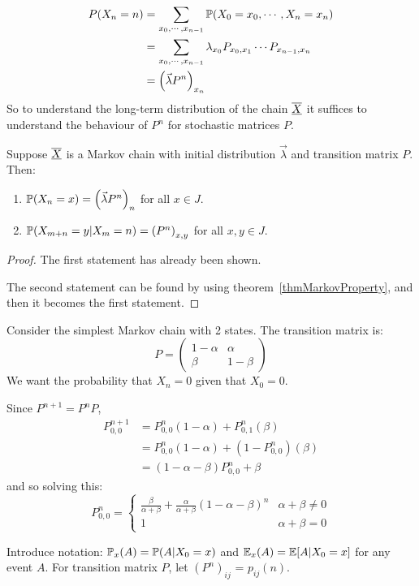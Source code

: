 \documentclass[../Main.tex]{subfiles}
\begin{document}
\begin{align*}
    P(X_n = n) &= \sum_{x_0, \cdots, x_{n - 1}} \P(X_0 = x_0, \cdots, X_n = x_n) \\
    &= \sum_{x_0, \cdots, x_{n-1}} \lambda_{x_0} \Pmat{0}{1} \cdots \Pmat{n-1}{n} \\
    &= \left(\vec{\lambda} P^n\right)_{x_n}
\end{align*}
So to understand the long-term distribution of the chain $\chain{X}$ it suffices to understand the behaviour of $P^n$ for stochastic matrices $P$.

\begin{theorem}
    Suppose $\chain{X}$ is a Markov chain with initial distribution $\vec{\lambda}$ and transition matrix $P$. Then:
    \begin{enumerate}
        \item $\P(X_n = x) = \left(\vec{\lambda} P^n\right)_n$ for all $x \in J$.
        \item $\P(X_{m + n} = y | X_m = n) = \left(P^n\right)_{x, y}$ for all $x, y \in J$.
    \end{enumerate}
    \label{thmMarkovMatPower}
\end{theorem}
\begin{proof}
    The first statement has already been shown.

    The second statement can be found by using theorem~\ref{thmMarkovProperty}, and then it becomes the first statement.
\end{proof}
\begin{example}
    Consider the simplest Markov chain with 2 states.
    The transition matrix is:
    \begin{equation*}
        P = 
        \begin{pmatrix}
            1 - \alpha & \alpha \\
            \beta & 1 - \beta
        \end{pmatrix}
    \end{equation*}
    We want the probability that $X_n = 0$ given that $X_0 = 0$.

    Since $P^{n+1} = P^n P$, 
    \begin{align*}
        P_{0, 0}^{n+1} &= P_{0, 0}^n (1 - \alpha) + P_{0, 1}^n (\beta) \\
        &= P_{0, 0}^n (1 - \alpha) + (1 - P_{0, 0}^n) (\beta) \\
        &= (1 - \alpha - \beta) P_{0, 0}^n + \beta
    \end{align*}
    and so solving this:
    \begin{equation*}
        P_{0, 0}^n =
        \begin{cases}
            \frac{\beta}{\alpha + \beta} + \frac{\alpha}{\alpha + \beta} (1 - \alpha - \beta)^n & \alpha + \beta \neq 0 \\
            1 & \alpha + \beta = 0
        \end{cases}
    \end{equation*}
\end{example}
Introduce notation:
$\P_x(A) = \P(A | X_0 = x)$ and $\E_x(A) = \E[A | X_0 = x]$ for any event $A$. For transition matrix $P$, let $(P^n)_{ij}$ = $p_{ij}(n)$.
\end{document}
